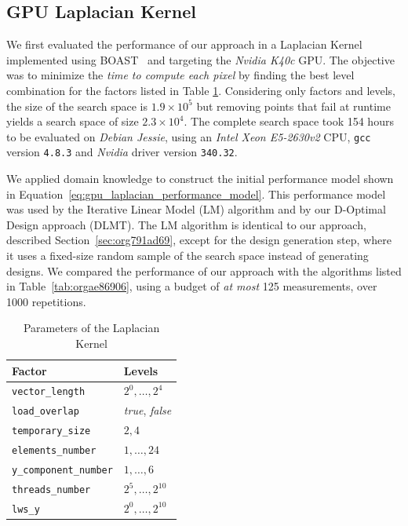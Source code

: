 \documentclass[conference]{IEEEtran}
\begin{document}
\subsection{GPU Laplacian Kernel}
\label{sec:org7f82b19}
We first evaluated the performance of our approach in a Laplacian Kernel
implemented using BOAST~\cite{videau2017boast} and targeting the \emph{Nvidia
K40c} GPU. The objective was to minimize the \emph{time to compute each pixel} by
finding the best level combination for the factors listed in Table
\ref{tab:orgf37caea}. Considering only factors and levels, the size of the
search space is \(1.9\times10^5\) but removing points that fail at runtime yields
a search space of size \(2.3\times10^4\). The complete search space took 154 hours
to be evaluated on \emph{Debian Jessie}, using an \emph{Intel Xeon E5-2630v2} CPU,
\texttt{gcc} version \texttt{4.8.3} and \emph{Nvidia} driver version \texttt{340.32}.

We applied domain knowledge to construct the initial performance model shown in
Equation~\eqref{eq:gpu_laplacian_performance_model}. This performance model
was used by the Iterative Linear Model (LM) algorithm and by our D-Optimal
Design approach (DLMT). The LM algorithm is identical to our approach, described
Section~\ref{sec:org791ad69}, except for the design
generation step, where it uses a fixed-size random sample of the search space
instead of generating designs. We compared the performance of our approach with
the algorithms listed in Table~\ref{tab:orgae86906}, using a
budget of \emph{at most} 125 measurements, over 1000 repetitions.

\begin{table}[ht]
\caption{\label{tab:orgf37caea}
Parameters of the Laplacian Kernel}
\centering
\footnotesize
\begin{tabular}{ll}
\toprule
Factor & Levels\\
\midrule
\texttt{vector\_length} & \(2^0,\dots,2^4\)\\
\texttt{load\_overlap} & \textit{true}, \textit{false}\\
\texttt{temporary\_size} & \(2,4\)\\
\texttt{elements\_number} & \(1,\dots,24\)\\
\texttt{y\_component\_number} & \(1,\dots,6\)\\
\texttt{threads\_number} & \(2^5,\dots,2^{10}\)\\
\texttt{lws\_y} & \(2^0,\dots,2^{10}\)\\
\bottomrule
\end{tabular}
\end{table}
\end{document}
